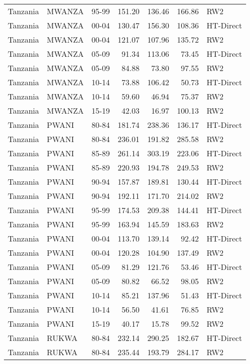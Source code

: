\begin{longtable}{lllrrrl}
  Tanzania & MWANZA & 95-99 & 151.20 & 136.46 & 166.86 & RW2 \\ 
  Tanzania & MWANZA & 00-04 & 130.47 & 156.30 & 108.36 & HT-Direct \\ 
  Tanzania & MWANZA & 00-04 & 121.07 & 107.96 & 135.72 & RW2 \\ 
  Tanzania & MWANZA & 05-09 & 91.34 & 113.06 & 73.45 & HT-Direct \\ 
  Tanzania & MWANZA & 05-09 & 84.88 & 73.80 & 97.55 & RW2 \\ 
  Tanzania & MWANZA & 10-14 & 73.88 & 106.42 & 50.73 & HT-Direct \\ 
  Tanzania & MWANZA & 10-14 & 59.60 & 46.94 & 75.37 & RW2 \\ 
  Tanzania & MWANZA & 15-19 & 42.03 & 16.97 & 100.13 & RW2 \\ 
  Tanzania & PWANI & 80-84 & 181.74 & 238.36 & 136.17 & HT-Direct \\ 
  Tanzania & PWANI & 80-84 & 236.01 & 191.82 & 285.58 & RW2 \\ 
  Tanzania & PWANI & 85-89 & 261.14 & 303.19 & 223.06 & HT-Direct \\ 
  Tanzania & PWANI & 85-89 & 220.93 & 194.78 & 249.53 & RW2 \\ 
  Tanzania & PWANI & 90-94 & 157.87 & 189.81 & 130.44 & HT-Direct \\ 
  Tanzania & PWANI & 90-94 & 192.11 & 171.70 & 214.02 & RW2 \\ 
  Tanzania & PWANI & 95-99 & 174.53 & 209.38 & 144.41 & HT-Direct \\ 
  Tanzania & PWANI & 95-99 & 163.94 & 145.59 & 183.63 & RW2 \\ 
  Tanzania & PWANI & 00-04 & 113.70 & 139.14 & 92.42 & HT-Direct \\ 
  Tanzania & PWANI & 00-04 & 120.28 & 104.90 & 137.49 & RW2 \\ 
  Tanzania & PWANI & 05-09 & 81.29 & 121.76 & 53.46 & HT-Direct \\ 
  Tanzania & PWANI & 05-09 & 80.82 & 66.52 & 98.05 & RW2 \\ 
  Tanzania & PWANI & 10-14 & 85.21 & 137.96 & 51.43 & HT-Direct \\ 
  Tanzania & PWANI & 10-14 & 56.50 & 41.61 & 76.85 & RW2 \\ 
  Tanzania & PWANI & 15-19 & 40.17 & 15.78 & 99.52 & RW2 \\ 
  Tanzania & RUKWA & 80-84 & 232.14 & 290.25 & 182.67 & HT-Direct \\ 
  Tanzania & RUKWA & 80-84 & 235.44 & 193.79 & 284.17 & RW2 \\ 

\end{longtable}

